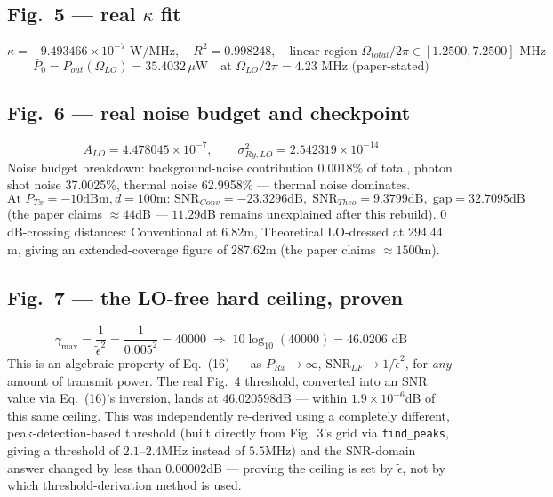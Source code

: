 \documentclass[11pt]{article}
\begin{document}
\subsection*{Fig.~5 --- real $\kappa$ fit}
\[
\kappa = -9.493466\times10^{-7}\text{ W/MHz}, \quad R^2=0.998248, \quad \text{linear region } \Omega_{total}/2\pi\in[1.2500,7.2500]\text{ MHz}
\]
\[
\bar P_0 = P_{out}(\Omega_{LO}) = 35.4032\,\mu\text{W} \quad\text{at }\Omega_{LO}/2\pi=4.23\text{ MHz (paper-stated)}
\]

\subsection*{Fig.~6 --- real noise budget and checkpoint}
\[
A_{LO} = 4.478045\times10^{-7}, \qquad \sigma_{Ry,LO}^2 = 2.542319\times10^{-14}
\]
Noise budget breakdown: background-noise contribution 0.0018\% of total, photon shot noise 37.0025\%, thermal noise 62.9958\% --- thermal noise dominates.
\[
\boxed{\text{At }P_{Tx}=-10\text{dBm}, d=100\text{m: SNR}_{Conv}=-23.3296\text{dB},\;\text{SNR}_{Theo}=9.3799\text{dB},\;\text{gap}=32.7095\text{dB}}
\]
(the paper claims $\approx44$dB --- $11.29$dB remains unexplained after this rebuild). $0$dB-crossing distances: Conventional at $6.82$m, Theoretical LO-dressed at $294.44$m, giving an extended-coverage figure of $287.62$m (the paper claims $\approx1500$m).

\subsection*{Fig.~7 --- the LO-free hard ceiling, proven}
\[
\gamma_{\max} = \frac{1}{\tilde\epsilon^2} = \frac{1}{0.005^2}=40000 \;\Rightarrow\; 10\log_{10}(40000)=\boxed{46.0206\text{ dB}}
\]
This is an algebraic property of Eq.~(16) --- as $P_{Rx}\to\infty$, $\text{SNR}_{LF}\to1/\tilde\epsilon^2$, for \emph{any} amount of transmit power. The real Fig.~4 threshold, converted into an SNR value via Eq.~(16)'s inversion, lands at $46.020598$dB --- within $1.9\times10^{-6}$dB of this same ceiling. This was independently re-derived using a completely different, peak-detection-based threshold (built directly from Fig.~3's grid via \texttt{find\_peaks}, giving a threshold of $2.1$--$2.4$MHz instead of $5.5$MHz) and the SNR-domain answer changed by less than $0.00002$dB --- proving the ceiling is set by $\tilde\epsilon$, not by which threshold-derivation method is used.
\end{document}
